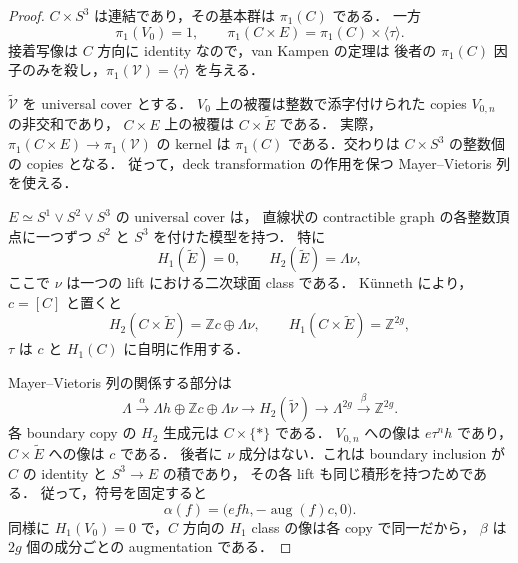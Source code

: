 \begin{proof}
$C\times S^3$ は連結であり，その基本群は $\pi_1(C)$ である．
一方
\[
 \pi_1(V_0)=1,\qquad
 \pi_1(C\times E)=\pi_1(C)\times\langle\tau\rangle.
\]
接着写像は $C$ 方向に identity なので，van Kampen の定理は
後者の $\pi_1(C)$ 因子のみを殺し，$\pi_1(\mathcal V)=\langle\tau\rangle$ を与える．

$\widetilde{\mathcal V}$ を universal cover とする．
$V_0$ 上の被覆は整数で添字付けられた copies $V_{0,n}$ の非交和であり，
$C\times E$ 上の被覆は $C\times\widetilde E$ である．
実際，$\pi_1(C\times E)\to\pi_1(\mathcal V)$ の kernel は
$\pi_1(C)$ である．交わりは $C\times S^3$ の整数個の copies となる．
従って，deck transformation の作用を保つ Mayer--Vietoris 列を使える．

$E\simeq S^1\vee S^2\vee S^3$ の universal cover は，
直線状の contractible graph の各整数頂点に一つずつ $S^2$ と $S^3$ を付けた模型を持つ．
特に
\[
 H_1(\widetilde E)=0,\qquad H_2(\widetilde E)=\Lambda\nu,
\]
ここで $\nu$ は一つの lift における二次球面 class である．
K\"unneth により，$c=[C]$ と置くと
\[
 H_2(C\times\widetilde E)=\mathbb Z c\oplus\Lambda\nu,
 \qquad H_1(C\times\widetilde E)=\mathbb Z^{2g},
\]
$\tau$ は $c$ と $H_1(C)$ に自明に作用する．

Mayer--Vietoris 列の関係する部分は
\begin{equation}\label{tnc:eq:cover-mv-degree-two}
 \Lambda\xrightarrow{\alpha}
 \Lambda h\oplus\mathbb Z c\oplus\Lambda\nu
 \longrightarrow H_2(\widetilde{\mathcal V})
 \longrightarrow\Lambda^{2g}
 \xrightarrow{\beta}\mathbb Z^{2g}.
\end{equation}
各 boundary copy の $H_2$ 生成元は $C\times\{*\}$ である．
$V_{0,n}$ への像は $e \tau^n h$ であり，
$C\times\widetilde E$ への像は $c$ である．
後者に $\nu$ 成分はない．これは boundary inclusion が
$C$ の identity と $S^3\to E$ の積であり，
その各 lift も同じ積形を持つためである．
従って，符号を固定すると
\[
 \alpha(f)=\bigl(e f h,-\operatorname{aug}(f)c,0\bigr).
\]
同様に $H_1(V_0)=0$ で，$C$ 方向の $H_1$ class の像は各 copy で同一だから，
$\beta$ は $2g$ 個の成分ごとの augmentation である．


\end{proof}
